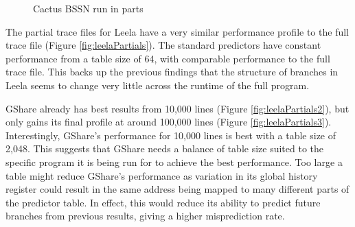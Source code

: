 \begin{figure}[htbp]
{
        \label{fig:cactusbssnPartials4}
    }
    \caption{Cactus BSSN run in parts}
    \label{fig:cactusbssnPartials}
\end{figure}

\clearpage
The partial trace files for Leela have a very similar performance profile to the full trace file (Figure \ref{fig:leelaPartials}). The standard predictors have constant performance from a table size of 64, with comparable performance to the full trace file. This backs up the previous findings that the structure of branches in Leela seems to change very little across the runtime of the full program.

GShare already has best results from 10,000 lines (Figure \ref{fig:leelaPartials2}), but only gains its final profile at around 100,000 lines (Figure \ref{fig:leelaPartials3}). Interestingly, GShare's performance for 10,000 lines is best with a table size of 2,048. This suggests that GShare needs a balance of table size suited to the specific program it is being run for to achieve the best performance. Too large a table might reduce GShare's performance as variation in its global history register could result in the same address being mapped to many different parts of the predictor table. In effect, this would reduce its ability to predict future branches from previous results, giving a higher misprediction rate.

